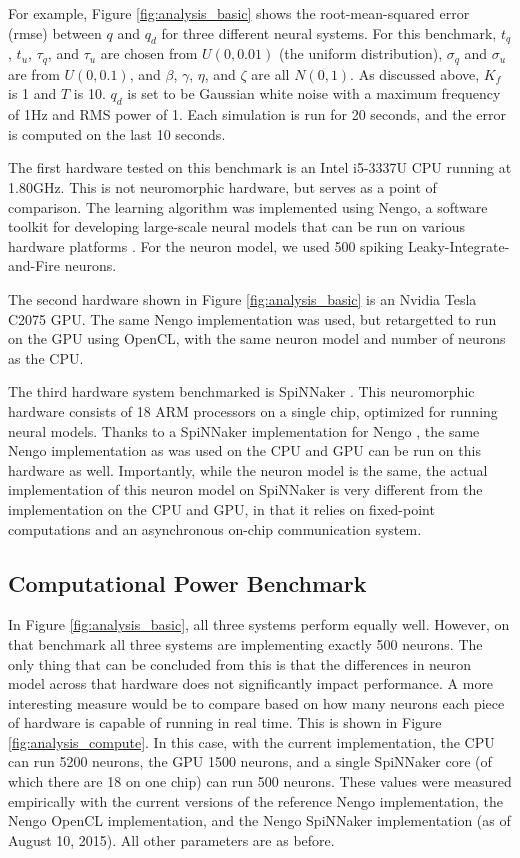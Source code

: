 \documentclass{frontiersSCNS} %
\begin{document}
For example, Figure \ref{fig:analysis_basic} shows the root-mean-squared
error (rmse) between $q$ and $q_d$ for three different neural systems.  For
this benchmark, $t_q$, $t_u$, $\tau_q$, and $\tau_u$ are chosen from $U(0, 0.01)$ (the uniform distribution), $\sigma_q$ and $\sigma_u$ are from $U(0, 0.1)$,
and $\beta$, $\gamma$, $\eta$, and $\zeta$ are all $N(0, 1)$.  As discussed
above, $K_f$ is 1 and $T$ is 10.  $q_d$ is set to be Gaussian white noise with
a maximum frequency of 1Hz and RMS power of 1.  Each simulation is run
for 20 seconds, and the error is computed on the last 10 seconds.

The first hardware tested on this benchmark is an Intel i5-3337U CPU running
at 1.80GHz.  This is not neuromorphic hardware, but serves as a
point of comparison.  The learning algorithm was implemented using Nengo,
a software toolkit for developing large-scale neural models that can be run
on various hardware platforms \cite{nengo}.  For the neuron model, we used
500 spiking Leaky-Integrate-and-Fire neurons.

The second hardware shown in Figure \ref{fig:analysis_basic} is an
Nvidia Tesla C2075 GPU.  The same Nengo implementation was used, but
retargetted to run on the GPU using OpenCL, with the same neuron model and
number of neurons as the CPU.

The third hardware system benchmarked is SpiNNaker \cite{furber2014}.  This
neuromorphic hardware consists of 18 ARM processors on a single chip, 
optimized for running neural models.  Thanks to a SpiNNaker implementation
for Nengo \cite{mundy2015}, the same Nengo implementation as was used on the
CPU and GPU can be run on this hardware as well.  Importantly, while the
neuron model is the same, the actual implementation of this neuron model on
SpiNNaker is very different from the implementation on the CPU and GPU, in
that it relies on fixed-point computations and an asynchronous on-chip
communication system.

\subsection{Computational Power Benchmark}

In Figure \ref{fig:analysis_basic}, all three systems perform equally well.
However, on that benchmark all three systems are implementing exactly 500
neurons.  The only thing that can be concluded from this is that the
differences in neuron model across that hardware does not significantly
impact performance.  A more interesting measure would be to compare based
on how many neurons each piece of hardware is capable of running in real time.
This is shown in Figure \ref{fig:analysis_compute}.  In this case, with the
current implementation, the CPU can
run 5200 neurons, the GPU 1500 neurons, and a single SpiNNaker core (of which
there are 18 on one chip) can run 500
neurons.  These values were measured empirically with the current versions
of the reference Nengo implementation, the Nengo OpenCL implementation,
and the Nengo SpiNNaker implementation (as of August 10, 2015).  All other
parameters are as before.
\end{document}
